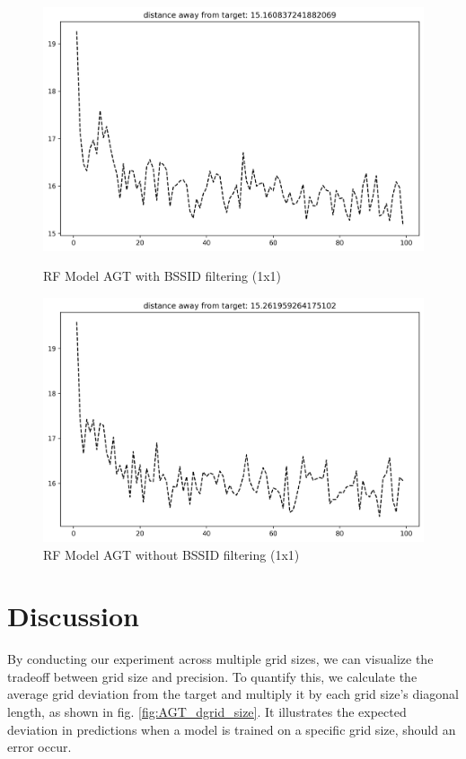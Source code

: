 \documentclass[conference]{IEEEtran}
\begin{document}
\begin{figure}[hbt!]
		\begin{minipage}{0.45\textwidth}
			\centering
			\includegraphics[width=\linewidth]{image4.png}
			\caption{RF Model AGT with BSSID filtering (1x1)}
			\label{fig:rf_agt_filter}
		\end{minipage}
		\hfill
		\begin{minipage}{0.45\textwidth}
			\centering
			\includegraphics[width=\linewidth]{image7.png}
			\caption{RF Model AGT without BSSID filtering (1x1)}
			\label{fig:rf_agt_nofilter}
		\end{minipage}
	\end{figure}
	
	\section{Discussion}
	By conducting our experiment across multiple grid sizes, we can visualize the tradeoff between grid size and precision. To quantify this, we calculate the average grid deviation from the target and multiply it by each grid size’s diagonal length, as shown in fig. \ref{fig:AGT_dgrid_size}. It illustrates the expected deviation in predictions when a model is trained on a specific grid size, should an error occur.
	
\end{document}
